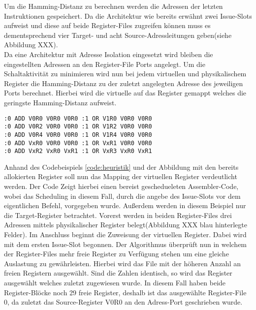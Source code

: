 Um die Hamming-Distanz zu berechnen werden die Adressen der letzten Instruktionen gespeichert. Da die Architektur  wie bereits erwähnt zwei Issue-Slots aufweist und diese auf beide Register-Files zugreifen können muss es dementsprechend vier Target- und acht Source-Adressleitungen geben(siehe Abbildung XXX).\\
Da eine Architektur mit Adresse Isolation eingesetzt wird bleiben die eingestellten Adressen an den Register-File Ports angelegt. Um die Schaltaktivität zu minimieren wird nun bei jedem virtuellen und physikalischem Register die Hamming-Distanz zu der zuletzt angelegten Adresse des jeweiligen Ports berechnet. Hierbei wird die virtuelle auf das Register gemappt welches die geringste Hamming-Distanz aufweist.\\
\begin{lstlisting}[frame=single, caption={Heuristik Beispiel},captionpos=b,label=code:heuristik]
:0 ADD V0R0 V0R0 V0R0 :1 OR V1R0 V0R0 V0R0
:0 ADD V0R2 V0R0 V0R0 :1 OR V1R2 V0R0 V0R0
:0 ADD V0R4 V0R0 V0R0 :1 OR V1R4 V0R0 V0R0
:0 ADD VxR0 V0R0 V0R0 :1 OR VxR1 V0R0 V0R0
:0 ADD VxR2 VxR0 VxR1 :1 OR VxR3 VxR0 VxR1
\end{lstlisting}
Anhand des Codebeispiels \ref{code:heuristik} und der Abbildung mit den bereits allokierten Register soll nun das Mapping der virtuellen Register verdeutlicht werden.
Der Code Zeigt hierbei einen bereist geschedueleten Assembler-Code, wobei das Scheduling in diesem Fall, durch die angebe des Issue-Slots vor dem eigentlichen Befehl, vorgegeben wurde. Außerdem werden in diesem Beispiel nur die Target-Register betrachtet.
Vorerst werden in beiden Register-Files drei Adressen mittels physikalischer Register belegt(Abbildung XXX blau hinterlegte Felder). Im Anschluss beginnt die Zuweisung der virtuellen Register.
Dabei wird mit dem ersten Issue-Slot begonnen. Der Algorithmus überprüft nun in welchem der Register-Files mehr freie Register zu Verfügung stehen um eine gleiche Auslastung zu gewährleisten. Hierbei wird das File mit der höheren Anzahl an freien Registern ausgewählt. Sind die Zahlen identisch, so wird das Register ausgewählt welches zuletzt zugewiesen wurde. In diesem Fall haben beide Register-Blöcke noch 29 freie Register, deshalb ist das ausgewählte Register-File 0, da zuletzt das Source-Register V0R0 an den Adress-Port geschrieben wurde.
